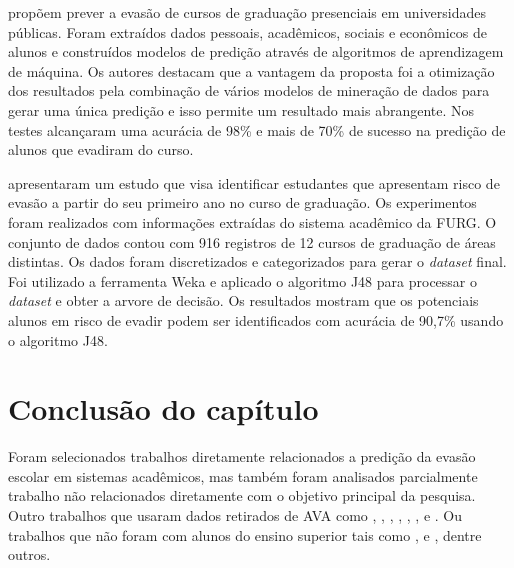 \documentclass[diss,capa]{texufpel}
\begin{document}
\citealp{kantorski2016prediccao} propõem prever a evasão de cursos de graduação presenciais em universidades públicas.
Foram extraídos dados pessoais, acadêmicos, sociais e econômicos de alunos e construídos modelos de predição através de algoritmos de aprendizagem de máquina.
Os autores destacam que a vantagem da proposta foi a otimização dos resultados pela combinação de vários modelos de mineração de dados para gerar uma única predição e isso permite um resultado mais abrangente.
Nos testes alcançaram uma acurácia de 98\% e mais de 70\% de sucesso na predição de alunos que evadiram do curso.


\citealp{lanes2018prediccao} apresentaram um estudo que visa identificar estudantes que apresentam risco de evasão a partir do seu primeiro ano no curso de graduação.
Os experimentos foram realizados com informações extraídas do sistema acadêmico da FURG.
O conjunto de dados contou com 916 registros de 12 cursos de graduação de áreas distintas.
Os dados foram discretizados e categorizados para gerar o \textit{dataset} final.
Foi utilizado a ferramenta Weka e aplicado o algoritmo J48 para processar o \textit{dataset} e obter a arvore de decisão.
Os resultados mostram que os potenciais alunos em risco de evadir podem ser identificados com acurácia de 90,7\% usando o algoritmo J48.




\section{Conclusão do capítulo}

Foram selecionados trabalhos diretamente relacionados a predição da evasão escolar em sistemas acadêmicos, mas também foram analisados parcialmente trabalho não relacionados diretamente com o objetivo principal da pesquisa. Outro trabalhos que usaram dados retirados de AVA como \citet{Braz2019}, \citet{Burlamaqui2017}, \citet{detoni2015modelagem}, \citet{Fernandes2017}, \citet{queiroga2015estudo}, \citet{Ramos2018}, \citet{Santos2014} e \citet{Silva2015}. Ou trabalhos que não foram com alunos do ensino superior tais como \citet{Bezerra2016}, \citet{Calixto2017} e \citet{Sales2019}, dentre outros.
\end{document}
